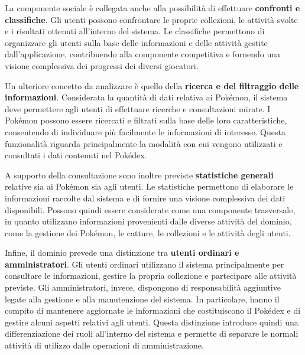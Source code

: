 \documentclass[a4paper,12pt]{report}
\begin{document}
\vspace{0,5 cm}
La componente sociale è collegata anche alla possibilità di effettuare \textbf{confronti e classifiche}. Gli utenti possono confrontare le proprie collezioni, le attività svolte e i risultati ottenuti all'interno del sistema. Le classifiche permettono di organizzare gli utenti sulla base delle informazioni e delle attività gestite dall'applicazione, contribuendo alla componente competitiva e fornendo una visione complessiva dei progressi dei diversi giocatori.

\vspace{0,5 cm}
Un ulteriore concetto da analizzare è quello della \textbf{ricerca e del filtraggio delle informazioni}. Considerata la quantità di dati relativa ai Pokémon, il sistema deve permettere agli utenti di effettuare ricerche e consultazioni mirate. I Pokémon possono essere ricercati e filtrati sulla base delle loro caratteristiche, consentendo di individuare più facilmente le informazioni di interesse. Questa funzionalità riguarda principalmente la modalità con cui vengono utilizzati e consultati i dati contenuti nel Pokédex.

\vspace{0,5 cm}
A supporto della consultazione sono inoltre previste \textbf{statistiche generali} relative sia ai Pokémon sia agli utenti. Le statistiche permettono di elaborare le informazioni raccolte dal sistema e di fornire una visione complessiva dei dati disponibili. Possono quindi essere considerate come una componente trasversale, in quanto utilizzano informazioni provenienti dalle diverse attività del dominio, come la gestione dei Pokémon, le catture, le collezioni e le attività degli utenti.

\vspace{0,5 cm}
Infine, il dominio prevede una distinzione tra \textbf{utenti ordinari e amministratori}. Gli utenti ordinari utilizzano il sistema principalmente per consultare le informazioni, gestire la propria collezione e partecipare alle attività previste. Gli amministratori, invece, dispongono di responsabilità aggiuntive legate alla gestione e alla manutenzione del sistema. In particolare, hanno il compito di mantenere aggiornate le informazioni che costituiscono il Pokédex e di gestire alcuni aspetti relativi agli utenti. Questa distinzione introduce quindi una differenziazione dei ruoli all'interno del sistema e permette di separare le normali attività di utilizzo dalle operazioni di amministrazione.
\end{document}
